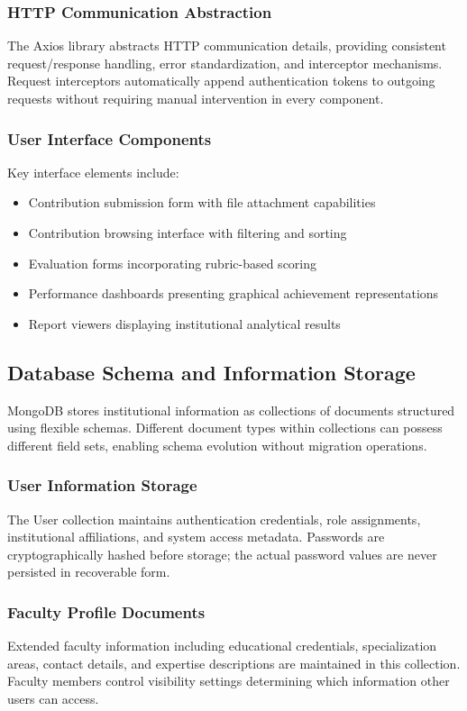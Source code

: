 \documentclass[conference]{IEEEtran}
\begin{document}
\subsubsection{HTTP Communication Abstraction}
The Axios library abstracts HTTP communication details, providing consistent request/response handling, error standardization, and interceptor mechanisms. Request interceptors automatically append authentication tokens to outgoing requests without requiring manual intervention in every component.

\subsubsection{User Interface Components}
Key interface elements include:
\begin{itemize}
\item Contribution submission form with file attachment capabilities
\item Contribution browsing interface with filtering and sorting  
\item Evaluation forms incorporating rubric-based scoring
\item Performance dashboards presenting graphical achievement representations
\item Report viewers displaying institutional analytical results
\end{itemize}

\subsection{Database Schema and Information Storage}
\label{subsec:database}

MongoDB stores institutional information as collections of documents structured using flexible schemas. Different document types within collections can possess different field sets, enabling schema evolution without migration operations.

\subsubsection{User Information Storage}
The User collection maintains authentication credentials, role assignments, institutional affiliations, and system access metadata. Passwords are cryptographically hashed before storage; the actual password values are never persisted in recoverable form.

\subsubsection{Faculty Profile Documents}
Extended faculty information including educational credentials, specialization areas, contact details, and expertise descriptions are maintained in this collection. Faculty members control visibility settings determining which information other users can access.
\end{document}
